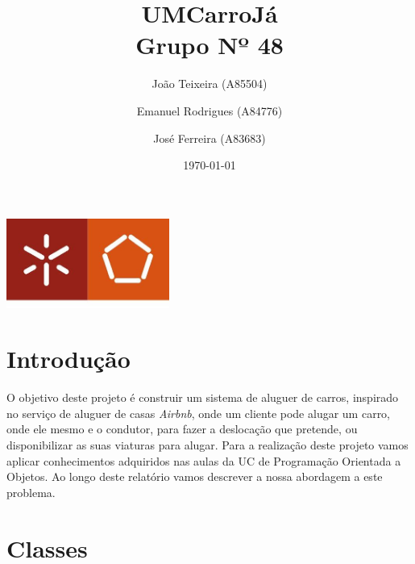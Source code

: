 \documentclass[a4paper]{report}
\begin{document}
\title{UMCarroJá\\ 
\large Grupo Nº 48}
\author{João Teixeira (A85504) \and Emanuel Rodrigues (A84776) \and José Ferreira (A83683)}
\date{\today}

\begin{center}
    \begin{minipage}{0.75\linewidth}
        \centering
        \includegraphics[width=0.4\textwidth]{eng.jpeg}\par\vspace{1cm}
        \vspace{1.5cm}
        \href{https://www.uminho.pt/PT}
        {\color{black}{\scshape\LARGE Universidade do Minho}} \par
        \vspace{1cm}
        {\color{black}{\scshape\Large Programação Orientada a Objetos}} \par
        \vspace{1.5cm}
        \maketitle
    \end{minipage}
\end{center}

\tableofcontents

\pagebreak

\chapter{Introdução}

O objetivo deste projeto é construir um sistema de aluguer de carros,
inspirado no serviço de aluguer de casas \textit{Airbnb}, onde um cliente
pode alugar um carro, onde ele mesmo e o condutor, para fazer a deslocação
que pretende, ou disponibilizar as suas viaturas para alugar.
Para a realização deste projeto vamos aplicar conhecimentos adquiridos nas
aulas da UC de Programação Orientada a Objetos.
Ao longo deste relatório vamos descrever a nossa abordagem a este problema.

\chapter{Classes}\label{chap:api}
\end{document}
